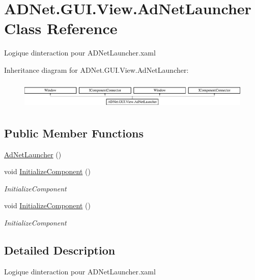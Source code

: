 \hypertarget{class_a_d_net_1_1_g_u_i_1_1_view_1_1_ad_net_launcher}{}\section{A\+D\+Net.\+G\+U\+I.\+View.\+Ad\+Net\+Launcher Class Reference}
\label{class_a_d_net_1_1_g_u_i_1_1_view_1_1_ad_net_launcher}


Logique d\textquotesingle{}interaction pour A\+D\+Net\+Launcher.\+xaml  


Inheritance diagram for A\+D\+Net.\+G\+U\+I.\+View.\+Ad\+Net\+Launcher\+:\begin{figure}[H]
\begin{center}
\leavevmode
\includegraphics[height=1.359223cm]{class_a_d_net_1_1_g_u_i_1_1_view_1_1_ad_net_launcher}
\end{center}
\end{figure}
\subsection*{Public Member Functions}
\begin{DoxyCompactItemize}
\item 
\hyperlink{class_a_d_net_1_1_g_u_i_1_1_view_1_1_ad_net_launcher_aeb53c28fabd9c60a448b8e3880ff927b}{Ad\+Net\+Launcher} ()
\item 
void \hyperlink{class_a_d_net_1_1_g_u_i_1_1_view_1_1_ad_net_launcher_a259a76fc00d3f31ea4d8290a49743bd2}{Initialize\+Component} ()
\begin{DoxyCompactList}\small\item\em Initialize\+Component \end{DoxyCompactList}\item 
void \hyperlink{class_a_d_net_1_1_g_u_i_1_1_view_1_1_ad_net_launcher_a259a76fc00d3f31ea4d8290a49743bd2}{Initialize\+Component} ()
\begin{DoxyCompactList}\small\item\em Initialize\+Component \end{DoxyCompactList}\end{DoxyCompactItemize}


\subsection{Detailed Description}
Logique d\textquotesingle{}interaction pour A\+D\+Net\+Launcher.\+xaml 

